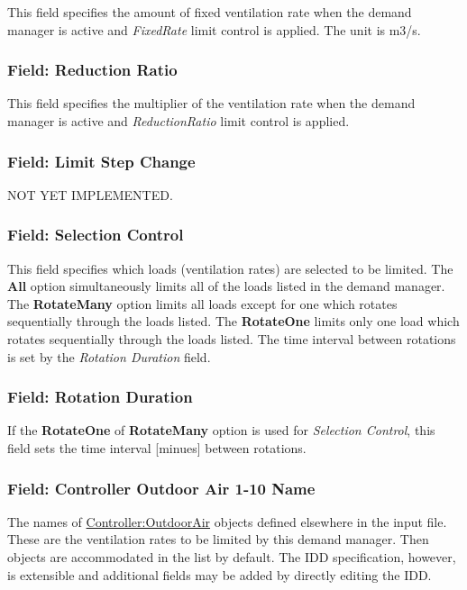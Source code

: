 This field specifies the amount of fixed ventilation rate when the demand manager is active and \emph{FixedRate} limit control is applied. The unit is m3/s.

\subsubsection{Field: Reduction Ratio}\label{field-reduction-ratio}

This field specifies the multiplier of the ventilation rate when the demand manager is active and \emph{ReductionRatio} limit control is applied.

\subsubsection{Field: Limit Step Change}\label{field-limit-step-change-3}

NOT YET IMPLEMENTED.

\subsubsection{Field: Selection Control}\label{field-selection-control-4}

This field specifies which loads (ventilation rates) are selected to be limited. The \textbf{All} option simultaneously limits all of the loads listed in the demand manager. The \textbf{RotateMany} option limits all loads except for one which rotates sequentially through the loads listed. The \textbf{RotateOne} limits only one load which rotates sequentially through the loads listed. The time interval between rotations is set by the \emph{Rotation Duration} field.

\subsubsection{Field: Rotation Duration}\label{field-rotation-duration-4}

If the \textbf{RotateOne} of \textbf{RotateMany} option is used for \emph{Selection Control}, this field sets the time interval {[}minues{]} between rotations.

\subsubsection{Field: Controller Outdoor Air 1-10 Name}\label{field-controller-outdoor-air-1-10-name}

The names of \hyperref[controlleroutdoorair]{Controller:OutdoorAir} objects defined elsewhere in the input file. These are the ventilation rates to be limited by this demand manager. Then objects are accommodated in the list by default. The IDD specification, however, is extensible and additional fields may be added by directly editing the IDD.

